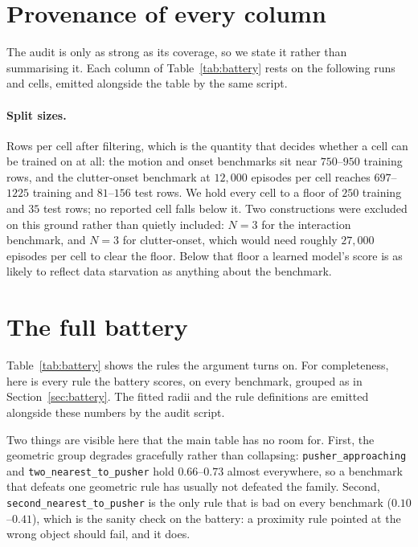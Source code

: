 \documentclass{article}
\begin{document}



\appendix
\section{Provenance of every column}
\label{app:provenance}
The audit is only as strong as its coverage, so we state it rather than summarising it. Each
column of Table~\ref{tab:battery} rests on the following runs and cells, emitted alongside the
table by the same script.

\begin{center}
\small

\end{center}

\paragraph{Split sizes.} Rows per cell after filtering, which is the quantity that decides
whether a cell can be trained on at all: the motion and onset benchmarks sit near
$750$--$950$ training rows, and the clutter-onset benchmark at $12{,}000$ episodes per cell
reaches $697$--$1225$ training and $81$--$156$ test rows. We hold every cell to a floor of
$250$ training and $35$ test rows; no reported cell falls below it. Two constructions were
excluded on this ground rather than quietly included: $N=3$ for the interaction benchmark, and
$N=3$ for clutter-onset, which would need roughly $27{,}000$ episodes per cell to clear the
floor. Below that floor a learned model's score is as likely to reflect data starvation as
anything about the benchmark.

\section{The full battery}
\label{app:battery}
Table~\ref{tab:battery} shows the rules the argument turns on. For completeness, here is every
rule the battery scores, on every benchmark, grouped as in Section~\ref{sec:battery}. The
fitted radii and the rule definitions are emitted alongside these numbers by the audit script.

Two things are visible here that the main table has no room for. First, the geometric group
degrades gracefully rather than collapsing: \texttt{pusher\_approaching} and
\texttt{two\_nearest\_to\_pusher} hold $0.66$--$0.73$ almost everywhere, so a benchmark that
defeats one geometric rule has usually not defeated the family. Second,
\texttt{second\_nearest\_to\_pusher} is the only rule that is bad on every benchmark
($0.10$--$0.41$), which is the sanity check on the battery: a proximity rule pointed at the
wrong object should fail, and it does.
\end{document}
